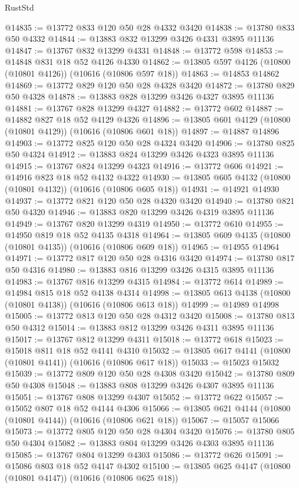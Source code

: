 \begin{lexlean}{RustStd}
\begin{coremodule}
@14835 := @13772 @833 @120 @50 @28 @4332 @3420
@14838 := @13780 @833 @50 @4332
@14844 := @13883 @832 @13299 @3426 @4331 @3895 @11136
@14847 := @13767 @832 @13299 @4331
@14848 := @13772 @598
@14853 := @14848 @831 @18 @52 @4126 @4330
@14862 := @13805 @597 @4126 (@10800 (@10801 @4126)) (@10616 (@10806 @597 @18))
@14863 := @14853 @14862
@14869 := @13772 @829 @120 @50 @28 @4328 @3420
@14872 := @13780 @829 @50 @4328
@14878 := @13883 @828 @13299 @3426 @4327 @3895 @11136
@14881 := @13767 @828 @13299 @4327
@14882 := @13772 @602
@14887 := @14882 @827 @18 @52 @4129 @4326
@14896 := @13805 @601 @4129 (@10800 (@10801 @4129)) (@10616 (@10806 @601 @18))
@14897 := @14887 @14896
@14903 := @13772 @825 @120 @50 @28 @4324 @3420
@14906 := @13780 @825 @50 @4324
@14912 := @13883 @824 @13299 @3426 @4323 @3895 @11136
@14915 := @13767 @824 @13299 @4323
@14916 := @13772 @606
@14921 := @14916 @823 @18 @52 @4132 @4322
@14930 := @13805 @605 @4132 (@10800 (@10801 @4132)) (@10616 (@10806 @605 @18))
@14931 := @14921 @14930
@14937 := @13772 @821 @120 @50 @28 @4320 @3420
@14940 := @13780 @821 @50 @4320
@14946 := @13883 @820 @13299 @3426 @4319 @3895 @11136
@14949 := @13767 @820 @13299 @4319
@14950 := @13772 @610
@14955 := @14950 @819 @18 @52 @4135 @4318
@14964 := @13805 @609 @4135 (@10800 (@10801 @4135)) (@10616 (@10806 @609 @18))
@14965 := @14955 @14964
@14971 := @13772 @817 @120 @50 @28 @4316 @3420
@14974 := @13780 @817 @50 @4316
@14980 := @13883 @816 @13299 @3426 @4315 @3895 @11136
@14983 := @13767 @816 @13299 @4315
@14984 := @13772 @614
@14989 := @14984 @815 @18 @52 @4138 @4314
@14998 := @13805 @613 @4138 (@10800 (@10801 @4138)) (@10616 (@10806 @613 @18))
@14999 := @14989 @14998
@15005 := @13772 @813 @120 @50 @28 @4312 @3420
@15008 := @13780 @813 @50 @4312
@15014 := @13883 @812 @13299 @3426 @4311 @3895 @11136
@15017 := @13767 @812 @13299 @4311
@15018 := @13772 @618
@15023 := @15018 @811 @18 @52 @4141 @4310
@15032 := @13805 @617 @4141 (@10800 (@10801 @4141)) (@10616 (@10806 @617 @18))
@15033 := @15023 @15032
@15039 := @13772 @809 @120 @50 @28 @4308 @3420
@15042 := @13780 @809 @50 @4308
@15048 := @13883 @808 @13299 @3426 @4307 @3895 @11136
@15051 := @13767 @808 @13299 @4307
@15052 := @13772 @622
@15057 := @15052 @807 @18 @52 @4144 @4306
@15066 := @13805 @621 @4144 (@10800 (@10801 @4144)) (@10616 (@10806 @621 @18))
@15067 := @15057 @15066
@15073 := @13772 @805 @120 @50 @28 @4304 @3420
@15076 := @13780 @805 @50 @4304
@15082 := @13883 @804 @13299 @3426 @4303 @3895 @11136
@15085 := @13767 @804 @13299 @4303
@15086 := @13772 @626
@15091 := @15086 @803 @18 @52 @4147 @4302
@15100 := @13805 @625 @4147 (@10800 (@10801 @4147)) (@10616 (@10806 @625 @18))

\end{coremodule}
\end{lexlean}
